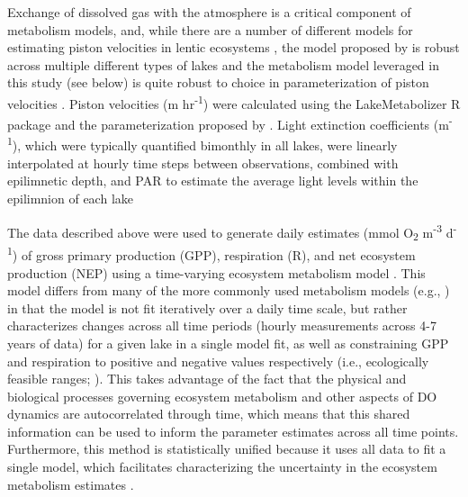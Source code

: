 \documentclass[12pt, oneside]{article}
\begin{document}
Exchange of dissolved gas with the atmosphere is a critical component of metabolism models, and, while there are a number of different models for estimating piston velocities in lentic ecosystems \citep{dugan_consequences_2016}, the model proposed by \citealt{vachon_ecosystem_2013} is robust across multiple different types of lakes \citep{dugan_consequences_2016} and the metabolism model leveraged in this study (see below) is quite robust to choice in parameterization of piston velocities \citep{phillips_timevarying_2020}. Piston velocities (m hr\textsuperscript{-1}) were calculated using the LakeMetabolizer R package \citep{winslow_lakemetabolizer_2016} and the parameterization proposed by \citealt{vachon_ecosystem_2013}. Light extinction coefficients (m\textsuperscript{-1}), which were typically quantified bimonthly in all lakes, were linearly interpolated at hourly time steps between observations, combined with epilimnetic depth, and PAR to estimate the average light levels within the epilimnion of each lake \citep{staehr_lake_2012,phillips_timevarying_2020}

The data described above were used to generate daily estimates (mmol O\textsubscript{2} m\textsuperscript{-3} d\textsuperscript{-1}) of gross primary production (GPP), respiration (R), and net ecosystem production (NEP) using a time-varying ecosystem metabolism model \citep{phillips_timevarying_2020}. This model differs from many of the more commonly used metabolism models (e.g., \citealt{winslow_lakemetabolizer_2016}) in that the model is not fit iteratively over a daily time scale, but rather characterizes changes across all time periods (hourly measurements across 4-7 years of data) for a given lake in a single model fit, as well as constraining GPP and respiration to positive and negative values respectively (i.e., ecologically feasible ranges; \citealt{phillips_timevarying_2020}). This takes advantage of the fact that the physical and biological processes governing ecosystem metabolism and other aspects of DO dynamics are autocorrelated through time, which means that this shared information can be used to inform the parameter estimates across all time points. Furthermore, this method is statistically unified because it uses all data to fit a single model, which facilitates characterizing the uncertainty in the ecosystem metabolism estimates \citep{phillips_timevarying_2020}. 
\end{document}
